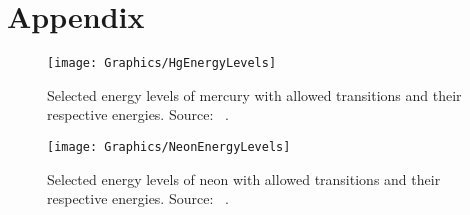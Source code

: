 \documentclass[a4paper,10pt,twocolumn]{article}
\begin{document}
    \section{Appendix}

    \begin{figure}[htbp]
        \texttt{[image: Graphics/HgEnergyLevels]}
        \center
        \caption{Selected energy levels of mercury with allowed transitions and their respective energies.
        Source: ~\cite{instr}.}
        \label{fig:energyLevelsHg}
    \end{figure}

    \begin{figure}[htbp]
        \texttt{[image: Graphics/NeonEnergyLevels]}
        \center
        \caption{Selected energy levels of neon with allowed transitions and their respective energies.
        Source: ~\cite{instr}.}
        \label{fig:energyLevelsNe}
    \end{figure}
\end{document}

